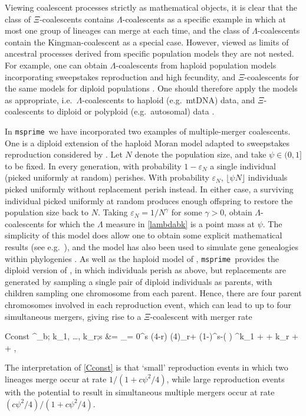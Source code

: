 \documentclass{article}
\newcommand{\msprime}[0]{\texttt{msprime}}
\begin{document}
Viewing coalescent processes strictly as mathematical
objects, it is clear that the class of $\Xi$-coalescents contains
$\Lambda$-coalescents as a specific example in which at most
one group of lineages can merge at each time, and the class of
$\Lambda$-coalescents contain the Kingman-coalescent as a special
case.  However, viewed as limits of ancestral processes derived from
specific population models they are not nested. For example, one can
obtain $\Lambda$-coalescents from haploid population models
incorporating sweepstakes reproduction and high fecundity,
and $\Xi$-coalescents for the same models for diploid populations \citep{BBE13}.
One should therefore apply the models as appropriate, i.e.\
$\Lambda$-coalescents to haploid (e.g.\ mtDNA) data,
and $\Xi$-coalescents to diploid or polyploid (e.g.\ autosomal) data \citep{blath2016site}.


In \msprime\ we have incorporated two examples of multiple-merger coalescents.
One is a diploid extension \citep{BBE13} of the haploid Moran model adapted
to sweepstakes reproduction considered by \cite{EW06}.
Let $N$ denote the population size, and take $\psi \in (0,1]$ to be fixed.
In every generation, with probability $1-\varepsilon_N$ a single individual
(picked uniformly at random) perishes.
With probability $\varepsilon_N$, $\lfloor \psi N \rfloor$ individuals picked uniformly
without replacement perish instead.
In either case, a surviving individual picked uniformly at random produces enough offspring
to restore the population size back to $N$.  Taking $\varepsilon_N =
1/N^\gamma$ for some $\gamma > 0$, \cite{EW06} obtain $\Lambda$-coalescents
for which the $\Lambda$ measure in \eqref{lambdabk} is a
point mass at $\psi$.  The simplicity of this model does allow one to obtain
some explicit mathematical results (see e.g.\
\cite{Der2012, EF2018,Freund2020,Matuszewski2017}), and the model has also been
used to simulate gene genealogies within phylogenies \citep{zhu2015hybrid}.
As well as the haploid model of \cite{EW06}, \msprime\ provides the diploid version
of \cite{BBE13}, in which individuals perish as above, but replacements are
generated by sampling a single pair of diploid individuals as parents, with
children sampling one chromosome from each parent.
Hence, there are four parent chromosomes involved in each reproduction event, which can lead to
up to four simultaneous mergers, giving rise to a $\Xi$-coalescent with merger rate
\begin{esplit}{Cconst} \lambda^{\text{Dirac}}_{b; k_1, \ldots,
k_r;s } &= \frac{c \psi^2 / 4}{1 + c \psi^2 / 4} \frac{4}{ \psi^2}\sum_{\ell = 0}^{s \wedge (4-r)} 
(4)_{r+\ell} (1-\psi)^{s-\ell }\left( \frac{\psi}{4} \right) ^{k_1 + \cdots +
k_r + \ell} + \frac{\one{r=1, k_1 = 2}}{1 + c \psi^2 / 4},  \\ \end{esplit}
The interpretation of \eqref{Cconst} is that `small' reproduction events in which
two lineages merge occur at rate $1/(1 + c\psi^2/4)$, while large reproduction events
with the potential to result in simultaneous multiple mergers occur at rate $(c\psi^2/4) / (1 + c\psi^2/4)$.
\end{document}
